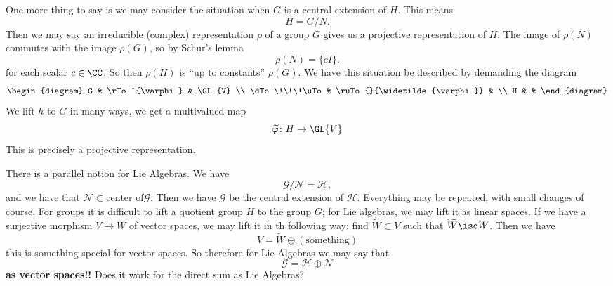 One more thing to say is we may consider the situation when $G$
is a central extension of $H$. This means
\begin{equation}
H=G/N.
\end{equation}
Then we may say an irreducible (complex) representation $\rho$ of
a group $G$ gives us a projective representation of $H$. The
image of $\rho(N)$ commutes with the image $\rho(G)$, so by
Schur's lemma 
\begin{equation}
\rho(N) = \{cI\}.
\end{equation}
for each scalar $c\in\CC$. So then $\rho(H)$ is ``up to
constants'' $\rho(G)$. We have this situation be described by
demanding the diagram
\begin{equation}
\begin{diagram}
  G      & \rTo^{\varphi}              & \GL{V} \\
\dTo\!\!\!\uTo & \ruTo{}{\widetilde{\varphi}} & \\
H        &                        &
\end{diagram}
\end{equation}
We lift $h$ to $G$ in many ways, we get a multivalued map
\begin{equation}
\widetilde{\varphi}\colon H\to\GL{V}
\end{equation}
This is precisely a projective representation.

There is a parallel notion for Lie Algebras. We have
\begin{equation}
\mathscr{G}/\mathscr{N}=\mathscr{H},
\end{equation}
and we have that $\mathscr{N}\subset\mbox{center of
}\mathscr{G}$. Then we have $\mathscr{G}$ be the central
extension of $\mathscr{H}$. Everything may be repeated, with
small changes of course. For groups it is difficult to lift a
quotient group $H$ to the group $G$; for Lie algebras, we may
lift it as linear spaces. If we have a surjective morphism $V\to W$
of vector spaces, we may lift it in th following way: find
$\widetilde{W}\subset V$ such that $\widetilde{W}\iso W$. Then we
have
\begin{equation}
V=\widetilde{W}\oplus(\mbox{something})
\end{equation}
this is something special for vector spaces. So therefore for Lie
Algebras we may say that 
\begin{equation}
\mathscr{G}=\mathscr{H}\oplus\mathscr{N}
\end{equation}
\textbf{as vector spaces!!} Does it work for the direct sum as
Lie Algebras?

